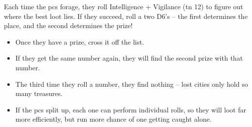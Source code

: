\begin{multicols}{2}
\label{lostForaging}

Each time the \glspl{pc} forage, they roll Intelligence + Vigilance (\gls{tn} 12) to figure out where the best loot lies.
If they succeed, roll a two D6's -- the first determines the place, and the second determines the prize!

\begin{itemize}
  \item
  Once they have a prize, cross it off the list.
  \item
  If they get the same number again, they will find the second prize with that number.
  \item
  The third time they roll a number, they find nothing -- lost cities only hold so many treasures.
  \item
  If the \glspl{pc} split up, each one can perform individual rolls, so they will loot far more efficiently, but run more chance of one getting caught alone.

\end{itemize}

\end{multicols}

\needspace{12em}
\hrulefill

\begin{multicols}{2}

\jelly

\jelly

\jelly

\griffin

\chitincrawler

\demilich

\dragon

\end{multicols}
